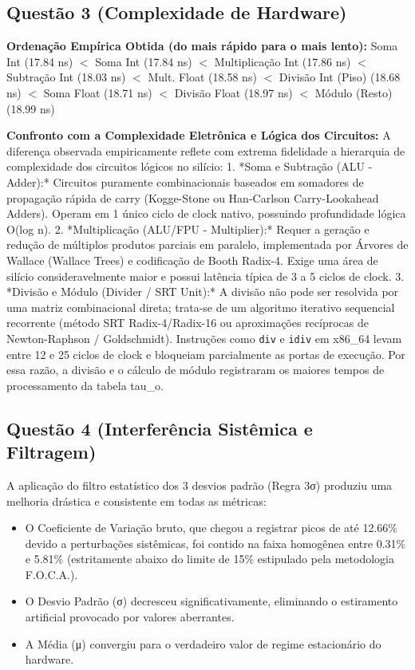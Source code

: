 \documentclass[10pt,a4paper]{article}
\begin{document}
\subsection*{Questão 3 (Complexidade de Hardware)}
\textbf{Ordenação Empírica Obtida (do mais rápido para o mais lento):}
Soma Int (17.84 ns) $<$ Soma Int (17.84 ns) $<$ Multiplicação Int (17.86 ns) $<$ Subtração Int (18.03 ns) $<$ Mult. Float (18.58 ns) $<$ Divisão Int (Piso) (18.68 ns) $<$ Soma Float (18.71 ns) $<$ Divisão Float (18.97 ns) $<$ Módulo (Resto) (18.99 ns)

\textbf{Confronto com a Complexidade Eletrônica e Lógica dos Circuitos:}
A diferença observada empiricamente reflete com extrema fidelidade a hierarquia de complexidade dos circuitos lógicos no silício:
1. *Soma e Subtração (ALU - Adder):* Circuitos puramente combinacionais baseados em somadores de propagação rápida de carry (Kogge-Stone ou Han-Carlson Carry-Lookahead Adders). Operam em 1 único ciclo de clock nativo, possuindo profundidade lógica O(log n).
2. *Multiplicação (ALU/FPU - Multiplier):* Requer a geração e redução de múltiplos produtos parciais em paralelo, implementada por Árvores de Wallace (Wallace Trees) e codificação de Booth Radix-4. Exige uma área de silício consideravelmente maior e possui latência típica de 3 a 5 ciclos de clock.
3. *Divisão e Módulo (Divider / SRT Unit):* A divisão não pode ser resolvida por uma matriz combinacional direta; trata-se de um algoritmo iterativo sequencial recorrente (método SRT Radix-4/Radix-16 ou aproximações recíprocas de Newton-Raphson / Goldschmidt). Instruções como \texttt{div} e \texttt{idiv} em x86\_64 levam entre 12 e 25 ciclos de clock e bloqueiam parcialmente as portas de execução. Por essa razão, a divisão e o cálculo de módulo registraram os maiores tempos de processamento da tabela tau\_o.

\subsection*{Questão 4 (Interferência Sistêmica e Filtragem)}
A aplicação do filtro estatístico dos 3 desvios padrão (Regra 3σ) produziu uma melhoria drástica e consistente em todas as métricas:
\begin{itemize}
  \item O Coeficiente de Variação bruto, que chegou a registrar picos de até 12.66\% devido a perturbações sistêmicas, foi contido na faixa homogênea entre 0.31\% e 5.81\% (estritamente abaixo do limite de 15\% estipulado pela metodologia F.O.C.A.).
  \item O Desvio Padrão (σ) decresceu significativamente, eliminando o estiramento artificial provocado por valores aberrantes.
  \item A Média (μ) convergiu para o verdadeiro valor de regime estacionário do hardware.
\end{itemize}
\end{document}
